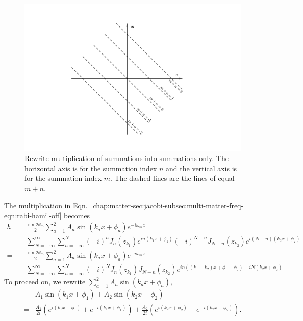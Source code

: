 \begin{figure}[!htbp]
    \centering
    \includegraphics[width=\textwidth]{chapters/assets/rabi/summation-algebra}
    \caption{Rewrite multiplication of summations into summations only. The horizontal axis is for the summation index $n$ and the vertical axis is for the summation index $m$. The dashed lines are the lines of equal $m+n$.}
    \label{chap:matter-sec:jacobi-subsec:multi-matter-freq-fig:summation-algebra}
\end{figure}
The multiplication in Eqn.~\ref{chap:matter-sec:jacobi-subsec:multi-matter-freq-eqn:rabi-hamil-off} becomes
\begin{align}
   h =& \frac{\sin 2\theta_m}{2} \sum_{a = 1}^2 A_a \sin (k_a x + \phi_a) e^{-i\omega_m x} \nonumber\\
   &\sum_{N=-\infty}^{\infty} \sum_{n=-\infty}^{N} (-i)^n J_n (z_{k_1}) e^{i n(k_1 x + \phi_1) } (-i)^{N-n} J_{N-n}(z_{k_2}) e^{i (N-n)(k_2 x + \phi_2)} \nonumber\\
   =&\frac{\sin 2\theta_m}{2} \sum_{a = 1}^2 A_a \sin (k_a x + \phi_a) e^{-i\omega_m x} \nonumber\\
   &\sum_{N=-\infty}^{\infty} \sum_{n=-\infty}^{N} (-i)^N J_{n}(z_{k_1}) J_{N-n}(z_{k_2}) e^{i n ((k_1-k_2)x + \phi_1 - \phi_2) + i N (k_2 x + \phi_2)}
   \label{chap:matter-sec:jacobi-subsec:multi-matter-freq-eqn:stimulated-multi-freq-hamiltonian-12-element} 
\end{align}
To proceed on, we rewrite $\sum_{a = 1}^2 A_a \sin (k_a x + \phi_a)$,
\begin{align}
   &A_1 \sin(k_1 x +\phi_1) + A_2 \sin(k_2 x +\phi_2) \nonumber\\
   = & \frac{A_1}{2i}\left( e^{i(k_1 x + \phi_1)} +  e^{-i(k_1 x + \phi_1)} \right) + \frac{A_2}{2i} \left( e^{i(k_2 x + \phi_2)} +  e^{-i(k_2 x + \phi_2)} \right).
\end{align}

